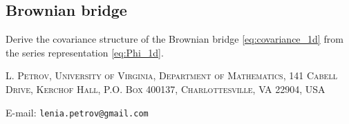 \documentclass[letterpaper,11pt,oneside,reqno]{article}
\numberwithin{equation}{section}
\theoremstyle{definition}
\begin{document}
\subsection{Brownian bridge}

Derive the covariance structure of the Brownian bridge
\eqref{eq:covariance_1d} from the series representation
\eqref{eq:Phi_1d}.







\medskip

\textsc{L. Petrov, University of Virginia, Department of Mathematics, 141 Cabell Drive, Kerchof Hall, P.O. Box 400137, Charlottesville, VA 22904, USA}

E-mail: \texttt{lenia.petrov@gmail.com}
\end{document}
